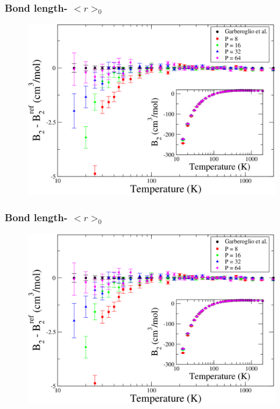 \documentclass[xcolor=svgnames]{beamer}
\begin{document}
        \begin{frame}
            \frametitle{Bond length- $< r >_0$}
            \begin{figure}
                \centering
                \includegraphics[scale=0.18,keepaspectratio]{s1GarberoglioAll.png}
            \end{figure}
        \end{frame}
        \begin{frame}
            \frametitle{Bond length- $< r >_0$}
            \begin{figure}
                \centering
                \includegraphics[scale=0.18,keepaspectratio]{s1GarberoglioAll.png}
            \end{figure}
        \end{frame}
\end{document}
